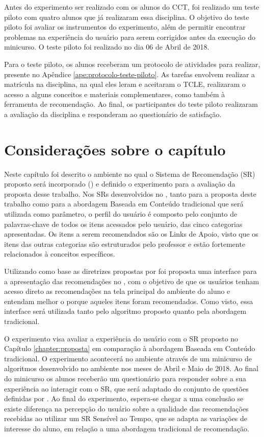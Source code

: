 Antes do experimento ser realizado com os alunos do CCT, foi realizado um teste piloto com
quatro alunos que já realizaram essa disciplina. O objetivo do teste piloto foi avaliar os instrumentos do experimento,
além de permitir encontrar problemas na experiência do usuário para serem corrigidos antes da execução do minicurso. O teste piloto
foi realizado no dia 06 de Abril de 2018.

Para o teste piloto, os alunos receberam um protocolo de atividades para realizar, presente no Apêndice \ref{ape:protocolo-teste-piloto}.
As tarefas envolvem realizar a matrícula na disciplina, na qual eles leram e aceitaram o TCLE, realizaram o acesso a alguns
conceitos e materiais complementares, como também à ferramenta de recomendação. Ao final, os participantes do teste piloto
realizaram a avaliação da disciplina e responderam ao questionário de satisfação.

\section{Considerações sobre o capítulo}

Neste capítulo foi descrito o ambiente no qual o Sistema de Recomendação (SR) proposto será incorporado (\adaptweb) e definido o
experimento para a avaliação da proposta desse trabalho. Nos SRs desenvolvidos no \adaptweb, tanto para a proposta deste trabalho como para a abordagem
Baseada em Conteúdo tradicional que será utilizada como parâmetro, o perfil do usuário é composto pelo conjunto de palavras-chave de todos os itens acessados pelo usuário, das
cinco categorias apresentadas. Os itens a serem recomendados são os Links de Apoio, visto que os itens das outras categorias
são estruturados pelo professor e estão fortemente relacionados à conceitos específicos.

Utilizando como base as diretrizes propostas por  foi proposta uma interface para a apresentação das recomendações no \adaptweb,
com o objetivo de que os usuários tenham acesso direto as recomendações na tela principal do ambiente do aluno e entendam
melhor o porque aqueles itens foram recomendados. Como visto, essa interface será utilizada tanto pelo algoritmo proposto
quanto pela abordagem tradicional.

O experimento visa avaliar a experiência do usuário com o SR proposto no Capítulo \ref{chapter:proposta} em
comparação à abordagem Baseada em Conteúdo tradicional. O experimento acontecerá no ambiente
\adaptweb através de um minicurso de algoritmos desenvolvido no ambiente nos meses de
Abril e Maio de 2018. Ao final do minicurso os alunos receberão um questionário para responder sobre a sua experiência
ao interagir com o SR, que será adaptado do conjunto de questões definidas por . Ao final do
experimento, espera-se chegar a uma conclusão se existe diferença na percepção do usuário sobre a qualidade
das recomendações recebidas ao utilizar um SR Sensível ao Tempo, que se adapta as variações de interesse do
aluno, em relação a uma abordagem tradicional de recomendação.
